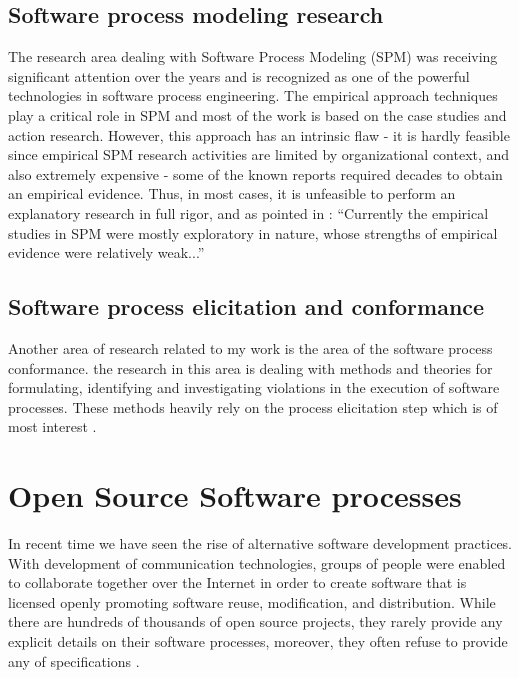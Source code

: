 \subsection{Software process modeling research}
The research area dealing with Software Process Modeling (SPM) was receiving significant 
attention over the years and is recognized as one of the powerful technologies
in software process engineering. The empirical approach techniques play a critical role
in SPM and most of the work is based on the case studies and action research. 
However, this approach has an intrinsic flaw - it is hardly feasible since
empirical SPM research activities are limited by organizational context, and also extremely 
expensive - some of the known reports required decades to obtain an empirical evidence.
Thus, in most cases, it is unfeasible to perform an explanatory research in full rigor,
and as pointed in \cite{citeulike:11079867}: ``Currently the empirical studies in SPM were 
mostly exploratory in nature, whose strengths of empirical evidence were relatively weak...''

\subsection{Software process elicitation and conformance}
Another area of research related to my work is the area of the software process conformance. 
the research in this area is dealing with methods and theories for formulating, identifying and
investigating violations in the execution of software processes. These methods heavily rely
on the process elicitation step which is of most interest .

\section{Open Source Software processes}\label{oss.processes}
In recent time we have seen the rise of alternative software development practices. 
With development of communication technologies, groups of people were 
enabled to collaborate together over the Internet in order to create software that is 
licensed openly promoting software reuse, modification, and distribution. While there are 
hundreds of thousands of open source projects, they rarely provide any explicit details on 
their software processes, moreover, they often refuse to provide any of 
specifications \cite{Torvalds:2005}. 

